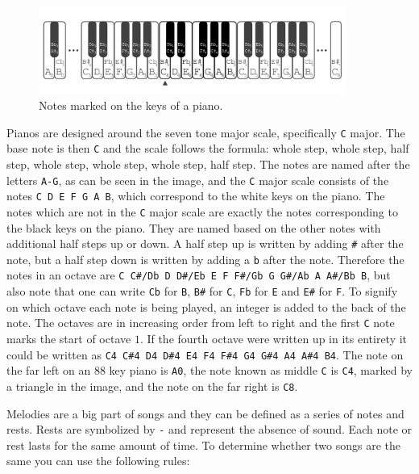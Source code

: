 \begin{figure}[ht!]
  \centering
    \includegraphics[width=0.9\textwidth]{piano}
  \caption{Notes marked on the keys of a piano.}
\end{figure}

Pianos are designed around the seven tone major scale, specifically \texttt{C} major.
The base note is then \texttt{C} and the scale follows the formula:
whole step, whole step, half step, whole step, whole step, whole step, half step.
The notes are named after the letters \texttt{A-G}, as can be seen in the image, and the \texttt{C} major scale consists of the notes \texttt{C D E F G A B}, which correspond to the white keys on the piano.
The notes which are not in the \texttt{C} major scale are exactly the notes corresponding to the black keys on the piano.
They are named based on the other notes with additional half steps up or down.
A half step up is written by adding \texttt{\#} after the note, but a half step down is written by adding a \texttt{b} after the note.
Therefore the notes in an octave are \texttt{C C\#/Db D D\#/Eb E F F\#/Gb G G\#/Ab A A\#/Bb B}, but also note that one can write \texttt{Cb} for \texttt{B}, \texttt{B\#} for \texttt{C}, \texttt{Fb} for \texttt{E} and \texttt{E\#} for \texttt{F}.
To signify on which octave each note is being played, an integer is added to the back of the note.
The octaves are in increasing order from left to right and the first \texttt{C} note marks the start of octave $1$.
If the fourth octave were written up in its entirety it could be written as \texttt{C4 C\#4 D4 D\#4 E4 F4 F\#4 G4 G\#4 A4 A\#4 B4}.
The note on the far left on an $88$ key piano is \texttt{A0}, the note known as middle \texttt{C} is \texttt{C4}, marked by a triangle in the image, and the note on the far right is \texttt{C8}.

Melodies are a big part of songs and they can be defined as a series of notes and rests.
Rests are symbolized by \texttt{-} and represent the absence of sound.
Each note or rest lasts for the same amount of time.
To determine whether two songs are the same you can use the following rules:


